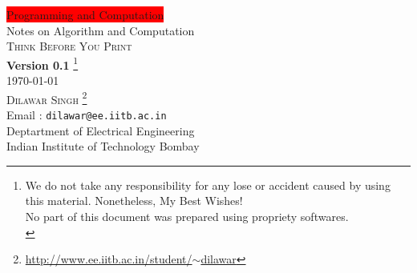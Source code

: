 \begin{titlepage}
\thispagestyle{empty}
\begin{center}
\colorbox{red}{\color{black}\small{Programming and Computation}}\\
\vspace{50mm}
\huge{Notes on Algorithm and Computation}\\
\vspace{25mm}
\vspace*{30mm}
\tiny{\textsc{Think Before You Print}}\\
\normalsize
\textbf{Version 0.1} \footnote{
We do not take any responsibility for any lose or accident caused  
by using this material. Nonetheless, My Best Wishes!
\\
No part of this document was prepared using propriety softwares.\\
}
\\
\today\\
\vspace{25mm}
\large{\textsc{Dilawar Singh}
\footnote{\href{http://www.ee.iitb.ac.in/student/~dilawar}{http://www.ee.iitb.ac.in/student/$\sim$dilawar}}}\\
Email : \texttt{dilawar@ee.iitb.ac.in}\\
Deptartment of Electrical Engineering\\
Indian Institute of Technology Bombay\\
\end{center}
\end{titlepage}
